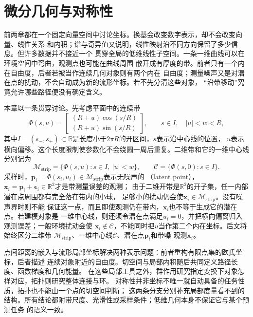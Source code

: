 \chapter{微分几何与对称性}
\label{chap:differential-geometry-and-symmetry}

前两章都在一个固定向量空间中讨论坐标。换基会改变数字表示，却不会改变向量、线性关系
和内积；谱与奇异值又说明，线性映射沿不同方向保留了多少信息。但许多数据并不接近一个
贯穿全局的低维线性子空间。一条一维曲线可以在环境空间中弯曲，观测点也可能在曲线周围
散开成有厚度的带。前者只有一个内在自由度，后者若被当作连续几何对象则有两个内在
自由度；测量噪声又是对潜在点的扰动，不会自动成为新的流形坐标。若不先分清这些对象，
“沿带移动”究竟允许哪些路径便没有确定含义。

本章以一条贯穿讨论。先考虑平面中的连续带
\begin{equation}
  \Phi(s,u)
  =
  \begin{bmatrix}
    (R+u)\cos(s/R)\\
    (R+u)\sin(s/R)
  \end{bmatrix},
  \qquad
  s\in I,\quad |u|<w<R,
  \label{eq:geometry-curved-strip-parameterization}
\end{equation}
其中$I=(s_-,s_+)\subset\mathbb{R}$是长度小于$2\pi R$的开区间，$s$表示沿中心线的位置，
$u$表示横向偏移。这个长度限制使参数化不会绕圆一周后重复。二维带和它的一维中心线
分别记为
\[
  \mathcal{M}_{\mathrm{strip}}
  =
  \{\Phi(s,u):s\in I,\ |u|<w\},
  \qquad
  \mathcal{C}
  =
  \{\Phi(s,0):s\in I\}.
\]
采样时，$\bm{p}_i=\Phi(s_i,u_i)\in\mathcal{M}_{\mathrm{strip}}$表示无噪声的
（latent point），
$\bm{x}_i=\bm{p}_i+\bm{\epsilon}_i\in\mathbb{R}^2$才是带测量误差的观测；
由于二维开带是$\mathbb{R}^2$的开子集，任一内部潜在点周围都有完全落在带内的小球，
足够小的扰动仍会使$\bm{x}_i\in\mathcal{M}_{\mathrm{strip}}$。没有噪声界时则不能
保证这一点，而且即使观测仍在带内，$\bm{x}_i$也不等于生成它的潜在点。若建模对象是
一维中心线，则还须令潜在点满足$u_i=0$，并把横向偏离归入观测误差；一般环境扰动会使
$\bm{x}_i\notin\mathcal{C}$，不能同时把$u$当作第二个内在坐标。后文将始终区分二维带
$\mathcal{M}_{\mathrm{strip}}$、一维中心线$\mathcal{C}$、潜在点$\bm{p}_i$和带噪
观测$\bm{x}_i$。

点间距离的嵌入与流形局部坐标解决两种表示问题：前者重构有限点集的欧氏坐标，后者描述
连续对象附近的自由度。切空间与局部内积随后共同定义路径长度、函数梯度和几何能量。
在这些局部工具之外，群作用研究指定变换下对象怎样对应，拓扑则研究整体连接与环。
对称性并非坐标不唯一就自动具备的任务性质，拓扑也不能由一个点的切空间判断；
这两条分支分别补充局部度量看不到的结构。所有结论都附带尺度、光滑性或采样条件；低维几何本身不保证它与某个预测任务
的语义一致。


